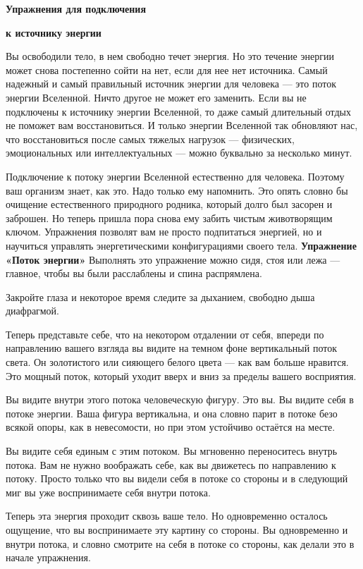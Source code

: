 \nopagenumbers
\centerline{\bf Упражнения для подключения}
\centerline{\bf к источнику энергии}
\medskip
Вы освободили тело, в нем свободно течет энергия. Но это течение энергии может снова постепенно
сойти на нет, если для нее нет источника. Самый надежный и самый правильный источник энергии
для человека --- это поток энергии Вселенной. Ничто другое не может его заменить. Если вы не
подключены к источнику энергии Вселенной, то даже самый длительный отдых не поможет вам
восстановиться. И только энергии Вселенной так обновляют нас, что восстановиться после самых
тяжелых нагрузок --- физических, эмоциональных или интеллектуальных --- можно буквально за несколько минут.

Подключение к потоку энергии Вселенной естественно для человека. Поэтому ваш организм знает, как это. Надо только ему напомнить. Это опять словно бы очищение естественного природного родника, который долго был засорен и заброшен. Но теперь пришла пора снова ему забить чистым животворящим ключом. Упражнения позволят вам не просто подпитаться энергией, но и научиться управлять энергетическими конфигурациями своего тела.
\bigskip
{\bf Упражнение «Поток энергии»}
\medskip
Выполнять это упражнение можно сидя, стоя или лежа --- главное, чтобы вы были расслаблены и спина
распрямлена.

Закройте глаза и некоторое время следите за дыханием, свободно дыша диафрагмой.

Теперь представьте себе, что на некотором отдалении от себя, впереди по направлению вашего взгляда вы видите на темном фоне вертикальный поток света.
Он золотистого или сияющего белого цвета --- как вам больше нравится. Это мощный поток, который уходит вверх и вниз за пределы вашего восприятия.

Вы видите внутри этого потока человеческую фигуру. Это вы. Вы видите себя в потоке энергии. Ваша фигура вертикальна, и она словно парит в потоке безо всякой опоры, как в невесомости, но при этом устойчиво остаётся на месте.

Вы видите себя единым с этим потоком. Вы мгновенно переноситесь внутрь потока. Вам не нужно воображать себе, как вы движетесь по направлению к потоку. Просто только что вы видели себя в потоке со стороны и в следующий миг вы уже воспринимаете себя внутри потока.

Теперь эта энергия проходит сквозь ваше тело. Но одновременно осталось ощущение, что вы воспринимаете эту картину со стороны. Вы одновременно и внутри потока, и словно смотрите на себя в потоке со стороны, как делали это в начале упражнения.

